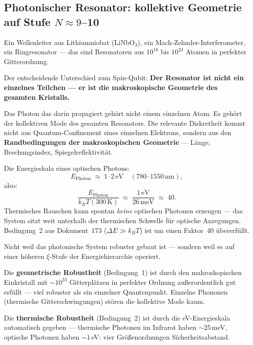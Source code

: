 \subsection{Photonischer Resonator: kollektive Geometrie auf Stufe
  \texorpdfstring{$N \approx 9$--10}{N≈9-10}}

Ein Wellenleiter aus Lithiumniobat (LiNbO$_3$),
ein Mach-Zehnder-Interferometer, ein Ringresonator ---
das sind Resonatoren aus $10^{18}$ bis $10^{23}$ Atomen
in perfekter Gitterordnung.

Der entscheidende Unterschied zum Spin-Qubit:
\textbf{Der Resonator ist nicht ein einzelnes Teilchen ---
er ist die makroskopische Geometrie des gesamten Kristalls.}

Das Photon das darin propagiert gehört nicht einem
einzelnen Atom. Es gehört der kollektiven Mode
des gesamten Resonators.
Die relevante Diskretheit kommt nicht aus
Quantum-Confinement eines einzelnen Elektrons,
sondern aus den \textbf{Randbedingungen der
makroskopischen Geometrie} --- Länge, Brechungsindex,
Spiegelreflektivität.

Die Energieskala eines optischen Photons:
\begin{equation}
  E_\text{Photon} \;\approx\; 1\text{--}2\,\text{eV}
  \quad (780\text{--}1550\,\text{nm}),
\end{equation}
also:
\begin{equation}
  \frac{E_\text{Photon}}{k_BT(300\,\text{K})}
  \;\approx\; \frac{1\,\text{eV}}{26\,\text{meV}}
  \;\approx\; 40.
\end{equation}
Thermisches Rauschen kann spontan \emph{keine} optischen
Photonen erzeugen --- das System sitzt weit unterhalb
der thermischen Schwelle für optische Anregungen.
Bedingung~2 aus Dokument~173 ($\Delta E \gg k_BT$)
ist um einen Faktor~40 übererfüllt.

\begin{important}
Nicht weil das photonische System robuster gebaut ist ---
sondern weil es auf einer höheren $\xi$-Stufe
der Energiehierarchie operiert.

Die \textbf{geometrische Robustheit} (Bedingung~1)
ist durch den makroskopischen Einkristall mit
$\sim 10^{23}$ Gitterplätzen in perfekter Ordnung
außerordentlich gut erfüllt ---
viel robuster als ein einzelner Quantenpunkt.
Einzelne Phononen (thermische Gitterschwingungen)
stören die kollektive Mode kaum.

Die \textbf{thermische Robustheit} (Bedingung~2)
ist durch die eV-Energieskala automatisch gegeben ---
thermische Photonen im Infrarot haben $\sim 25$\,meV,
optische Photonen haben $\sim 1$\,eV:
vier Größenordnungen Sicherheitsabstand.
\end{important}

